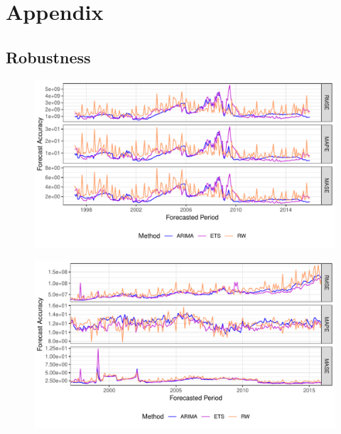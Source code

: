 \appendix
\section{Appendix}
\def\thepage{A\arabic{page}}

\subsection{Robustness}
\label{sec:robust}

\begin{figure}[H]
  \includegraphics[width=\textwidth]{fig/fig_eval_methods_top}
\end{figure}

\begin{figure}[H]
  \includegraphics[width=\textwidth]{fig/fig_eval_methods_bottom}
\end{figure}

